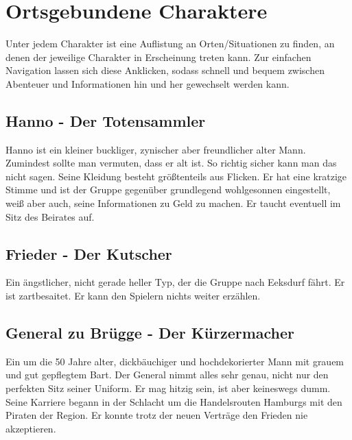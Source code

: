 

\section{Ortsgebundene Charaktere}

Unter jedem Charakter ist eine Auflistung an Orten/Situationen zu finden, an denen der jeweilige Charakter in Erscheinung treten kann. Zur einfachen Navigation lassen sich diese Anklicken, sodass schnell und bequem zwischen Abenteuer und Informationen hin und her gewechselt werden kann.

\subsection{Hanno - Der Totensammler}

Hanno ist ein kleiner buckliger, zynischer aber freundlicher alter Mann. Zumindest sollte man vermuten, dass er alt ist. So richtig sicher kann man das nicht sagen. Seine Kleidung besteht größtenteils aus Flicken. Er hat eine kratzige Stimme und ist der Gruppe gegenüber grundlegend wohlgesonnen eingestellt, weiß aber auch, seine Informationen zu Geld zu machen. Er taucht eventuell im Sitz des Beirates auf.

\subsection{Frieder - Der Kutscher}

Ein ängstlicher, nicht gerade heller Typ, der die Gruppe nach Eeksdurf fährt. Er ist zartbesaitet. Er kann den Spielern nichts weiter erzählen.

\subsection{General zu Brügge - Der Kürzermacher}

Ein um die 50 Jahre alter, dickbäuchiger und hochdekorierter Mann mit grauem und gut gepflegtem Bart. Der General nimmt alles sehr genau, nicht nur den perfekten Sitz seiner Uniform. Er mag hitzig sein, ist aber keineswegs dumm. Seine Karriere begann in der Schlacht um die Handelsrouten Hamburgs mit den Piraten der Region. Er konnte trotz der neuen Verträge den Frieden nie akzeptieren.


